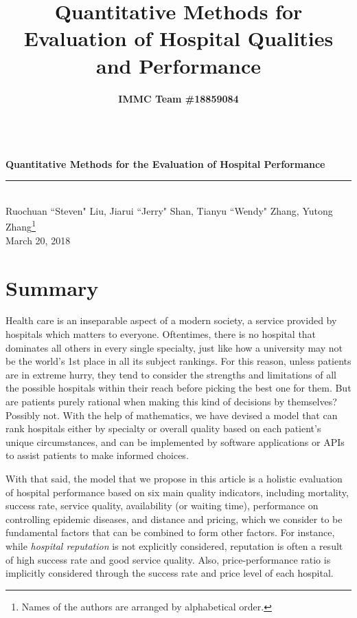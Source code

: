 \documentclass{article}
\title{Quantitative Methods for Evaluation of Hospital Qualities and Performance}
\date{}
\author{\textbf{IMMC Team \#18859084}}
\newcommand*{\xdash}[1][3em]{\rule[0.5ex]{#1}{0.55pt}}
\begin{document}

\begin{center}
\textbf{\Large\\ Quantitative Methods for the Evaluation of Hospital Performance}\\[11pt]

\xdash[200pt]\\[7pt]

\large{Ruochuan ``Steven" Liu, Jiarui ``Jerry" Shan, Tianyu ``Wendy" Zhang, Yutong Zhang\footnote{Names of the authors are arranged by alphabetical order.}}\\[8pt]
\normalsize{March 20, 2018}

\end{center}

\section*{Summary}

Health care is an inseparable aspect of a modern society, a service provided by hospitals which matters to everyone. Oftentimes, there is no hospital that dominates all others in every single specialty, just like how a university may not be the world's 1st place in all its subject rankings. For this reason, unless patients are in extreme hurry, they tend to consider the strengths and limitations of all the possible hospitals within their reach before picking the best one for them. But are patients purely rational when making this kind of decisions by themselves? Possibly not. With the help of mathematics, we have devised a model that can rank hospitals either by specialty or overall quality based on each patient's unique circumstances, and can be implemented by software applications or APIs to assist patients to make informed choices.

With that said, the model that we propose in this article is a holistic evaluation of hospital performance based on six main quality indicators, including mortality, success rate, service quality, availability (or waiting time), performance on controlling epidemic diseases, and distance and pricing, which we consider to be fundamental factors that can be combined to form other factors. For instance, while \textit{hospital reputation} is not explicitly considered, reputation is often a result of high success rate and good service quality. Also, price-performance ratio is implicitly considered through the success rate and price level of each hospital.
\end{document}
